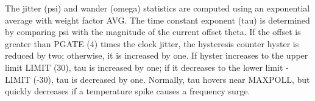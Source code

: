    The jitter (psi) and wander (omega) statistics are computed using an
   exponential average with weight factor AVG.  The time constant
   exponent (tau) is determined by comparing psi with the magnitude of
   the current offset theta.  If the offset is greater than PGATE (4)
   times the clock jitter, the hysteresis counter hyster is reduced by
   two; otherwise, it is increased by one.  If hyster increases to the
   upper limit LIMIT (30), tau is increased by one; if it decreases to
   the lower limit -LIMIT (-30), tau is decreased by one.  Normally, tau
   hovers near MAXPOLL, but quickly decreases if a temperature spike
   causes a frequency surge.

